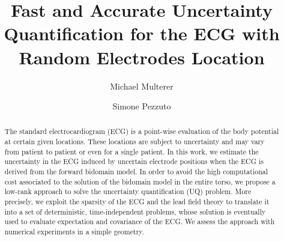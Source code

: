 \documentclass[runningheads]{llncs}
\begin{document}
%
\title{Fast and Accurate Uncertainty Quantification
for the ECG with Random Electrodes Location}
%
%
\author{Michael Multerer \and Simone Pezzuto}
%
%
\maketitle
%
\begin{abstract}
The standard electrocardiogram (ECG) is a point-wise evaluation of the body
potential at certain given locations.  These locations are subject to uncertainty
and may vary from patient to patient or even for a single patient. In this work,
we estimate the uncertainty in the ECG induced by uncertain electrode positions
when the ECG is derived from the forward bidomain model.
In order to avoid the high computational cost associated to the solution of the
bidomain model in the entire torso, we propose a low-rank approach to solve the
uncertainty quantification (UQ) problem.
More precisely, we exploit the sparsity of the ECG and the lead field theory
to translate it into a set of deterministic, time-independent problems,
whose solution is
eventually used to evaluate expectation and covariance of the ECG. We assess
the approach with numerical experiments in a simple geometry.
\end{abstract}
\end{document}
